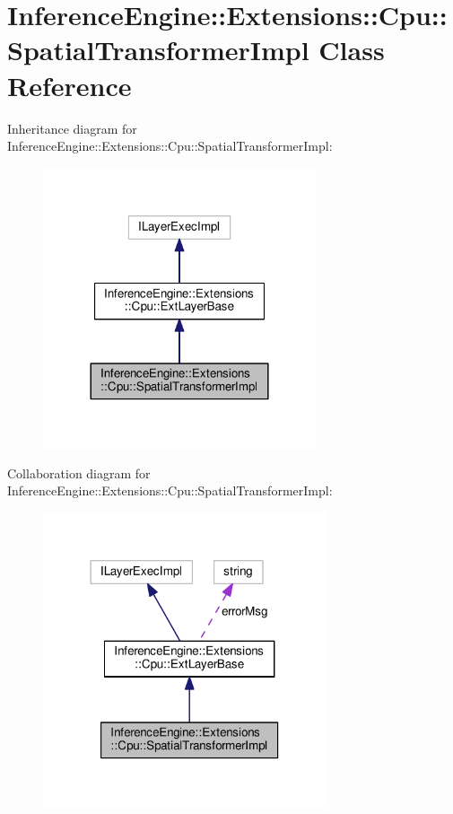 \hypertarget{classInferenceEngine_1_1Extensions_1_1Cpu_1_1SpatialTransformerImpl}{}\section{Inference\+Engine\+:\+:Extensions\+:\+:Cpu\+:\+:Spatial\+Transformer\+Impl Class Reference}
\label{classInferenceEngine_1_1Extensions_1_1Cpu_1_1SpatialTransformerImpl}


Inheritance diagram for Inference\+Engine\+:\+:Extensions\+:\+:Cpu\+:\+:Spatial\+Transformer\+Impl\+:
\nopagebreak
\begin{figure}[H]
\begin{center}
\leavevmode
\includegraphics[width=228pt]{classInferenceEngine_1_1Extensions_1_1Cpu_1_1SpatialTransformerImpl__inherit__graph}
\end{center}
\end{figure}


Collaboration diagram for Inference\+Engine\+:\+:Extensions\+:\+:Cpu\+:\+:Spatial\+Transformer\+Impl\+:
\nopagebreak
\begin{figure}[H]
\begin{center}
\leavevmode
\includegraphics[width=237pt]{classInferenceEngine_1_1Extensions_1_1Cpu_1_1SpatialTransformerImpl__coll__graph}
\end{center}
\end{figure}
